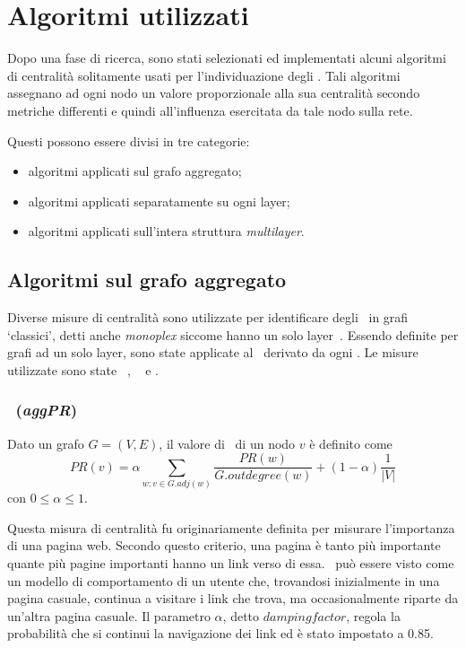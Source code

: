 \chapter{Algoritmi utilizzati}
Dopo una fase di ricerca, sono stati selezionati ed implementati alcuni algoritmi di centralità solitamente usati per 
l'individuazione degli \infsp. Tali algoritmi assegnano ad ogni nodo un valore proporzionale alla sua centralità 
secondo metriche differenti e quindi all'influenza esercitata da tale nodo sulla rete.

Questi possono essere divisi in tre categorie:
\begin{itemize}
\item algoritmi applicati sul grafo aggregato;
\item algoritmi applicati separatamente su ogni layer;
\item algoritmi applicati sull'intera struttura \textit{multilayer}.
\end{itemize}

\section{Algoritmi sul grafo aggregato}
Diverse misure di centralità sono utilizzate per identificare degli \infsp\ in grafi 
`classici', detti anche \textit{monoplex} siccome hanno un solo layer~\cite{kitsak:infsp}\cite{basaras:infsp}\cite{pei:infsp}. 
Essendo definite per grafi ad un solo layer, sono state applicate al \gragg\
derivato da ogni \muln. 
Le misure utilizzate sono state \PageRank~\cite{page:pagerank}, 
\kcore~\cite{batagelj:kcore} e 
\degree.


\subsection{\PageRank~(\textit{aggPR})}
\label{alg:pagerank}
\begin{definizione}[\PageRank]
    \label{def:pagerank}
    Dato un grafo $G=(V, E)$, il valore di \PageRank\ di un nodo $v$ è definito come
    \begin{equation}
        PR(v) = \alpha\sum_{w : v \in G.adj(w)}
        \frac{PR(w)}{G.outdegree(w)} + 
        (1-\alpha)\frac{1}{|V|}
    \end{equation}
    con $0 \le \alpha \le 1$.
\end{definizione}

Questa misura di centralità fu originariamente definita per misurare l'importanza di una pagina web. 
Secondo questo criterio, una pagina è tanto più importante quante più pagine importanti hanno un link 
verso di essa. 
\PageRank\ può essere visto come un modello di comportamento di un utente che, trovandosi inizialmente
in una pagina casuale, continua a visitare i link che trova, ma occasionalmente riparte da un'altra 
pagina casuale.
Il parametro $\alpha$, detto $damping factor$, regola la probabilità che si continui la navigazione dei link
ed è stato impostato a \num{0.85}.

